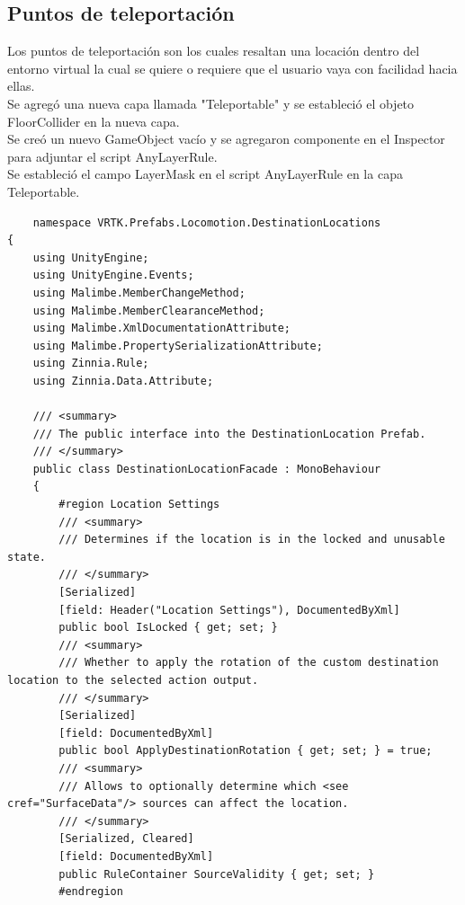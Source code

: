 \subsection{Puntos de teleportación}
Los puntos de teleportación son los cuales resaltan una locación dentro del entorno virtual la cual se quiere o requiere que el usuario vaya con facilidad hacia ellas.\\
Se agregó una nueva capa llamada "Teleportable" y se estableció el objeto FloorCollider en la nueva capa.\\
Se creó un nuevo GameObject vacío y se agregaron componente en el Inspector para adjuntar el script AnyLayerRule.\\
Se estableció el campo LayerMask en el script AnyLayerRule en la capa Teleportable.\\
\begin{verbatim}
    namespace VRTK.Prefabs.Locomotion.DestinationLocations
{
    using UnityEngine;
    using UnityEngine.Events;
    using Malimbe.MemberChangeMethod;
    using Malimbe.MemberClearanceMethod;
    using Malimbe.XmlDocumentationAttribute;
    using Malimbe.PropertySerializationAttribute;
    using Zinnia.Rule;
    using Zinnia.Data.Attribute;
 
    /// <summary>
    /// The public interface into the DestinationLocation Prefab.
    /// </summary>
    public class DestinationLocationFacade : MonoBehaviour
    {
        #region Location Settings
        /// <summary>
        /// Determines if the location is in the locked and unusable state.
        /// </summary>
        [Serialized]
        [field: Header("Location Settings"), DocumentedByXml]
        public bool IsLocked { get; set; }
        /// <summary>
        /// Whether to apply the rotation of the custom destination location to the selected action output.
        /// </summary>
        [Serialized]
        [field: DocumentedByXml]
        public bool ApplyDestinationRotation { get; set; } = true;
        /// <summary>
        /// Allows to optionally determine which <see cref="SurfaceData"/> sources can affect the location.
        /// </summary>
        [Serialized, Cleared]
        [field: DocumentedByXml]
        public RuleContainer SourceValidity { get; set; }
        #endregion
 

\end{verbatim}
